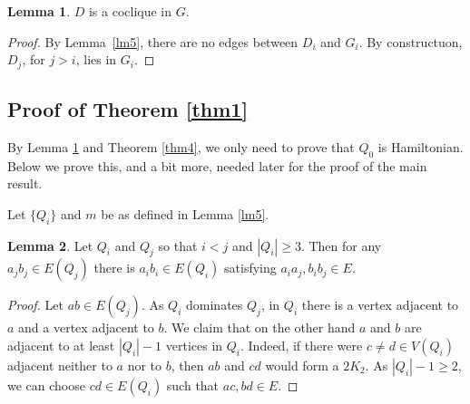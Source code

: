 \documentclass{amsart}
\theoremstyle{definition}
\newtheorem{lemma}{Lemma}
\begin{document}
\begin{lemma}\label{lmDcoclique}
$D$ is a coclique in $G$.
\end{lemma}
\begin{proof}
By Lemma~\ref{lm5}, there are no edges between $D_i$ and $G_i$. By constructuon, 
$D_j$, for $j>i$, lies in $G_i$.
\end{proof}

\subsection{Proof of Theorem \ref{thm1}}
By Lemma \ref{lmDcoclique} and Theorem \ref{thm4}, we only need to prove that $Q_0$ is Hamiltonian.
Below we prove this, and a bit more, needed later for the proof of the main result.

Let $\{Q_i\}$ and $m$ be as defined in Lemma \ref{lm5}.
\begin{lemma}\label{lem:twoQ}
Let $Q_i$ and $Q_j$ so that $i<j$ and $|Q_i|\geq 3$.
Then for any $a_j b_j\in E(Q_j)$  there is $a_i b_i\in E(Q_i)$ satisfying
$a_i a_j, b_i b_j\in E$.
\end{lemma}
\begin{proof}
Let $ab\in E(Q_j)$. As $Q_i$ dominates $Q_j$, in $Q_i$ there is a vertex adjacent to 
$a$ and a vertex adjacent to $b$.
We claim that on the other hand $a$ and $b$ are adjacent to at least $|Q_i|-1$ vertices in $Q_i$. 
Indeed, if there were $c\neq d\in V(Q_i)$ adjacent neither to $a$ nor to $b$, 
then $ab$ and $cd$ would form a $2K_2$.
As $|Q_i|-1\ge 2$, we can choose $cd\in E(Q_i)$ such that $ac, bd\in E$.
\end{proof}
 
\end{document}
